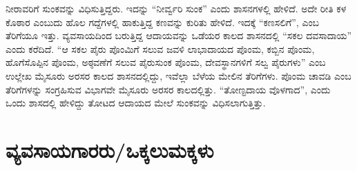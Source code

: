 ನೀರಾವರಿಗೆ ಸುಂಕವನ್ನು ವಿಧಿಸುತ್ತಿದ್ದರು. ಇದನ್ನು “ನೀರ್ವ್ವರಿ ಸುಂಕ” ಎಂದು ಶಾಸನಗಳಲ್ಲಿ ಹೇಳಿದೆ. ಅದೇ ರೀತಿ ಕಳ ಕೊಠಾರ ಎಂಬುದು ಹೊಲ ಗದ್ದೆಗಳಲ್ಲಿ ಹಾಕುತ್ತಿದ್ದ ಕಣವನ್ನು ಕುರಿತು ಹೇಳಿದೆ. ಇದಕ್ಕೆ “ಕಣಸಲಿಗೆ”, ಎಂಬ ತೆರಿಗೆಯೂ ಇತ್ತು. ವ್ಯವಸಾಯದಿಂದ ಬರುತ್ತಿದ್ದ ಆದಾಯವನ್ನು ಒಡೆಯರ ಕಾಲದ ಶಾಸನದಲ್ಲಿ “ಸಕಲ ದವಸಾದಾಯ” ಎಂದು ಕರೆದಿದೆ. “ಆ ಸಕಲ ಪೈರು ಪೊಂಮಿಗೆ ಸಲುವ ಜವಳಿ ಲಾಭಾದಾಯದ ಪೊಂಮ, ಕಬ್ಬಿನ ಪೊಂಮ, ಹೊಗೆಸೊಪ್ಪಿನ ಪೊಂಮ, ಅಠ್ಠವಣೆಗೆ ಸಲುವ ಪೈರುಸುಂಕ ಪೊಂಮ, ದೇವಸ್ಥಾನಗಳಿಗೆ ಸಲ್ವ ಪೈರುಗಳು” ಎಂಬ ಉಲ್ಲೇಖ ಮೈಸೂರು ಅರಸರ ಕಾಲದ ಶಾಸನದಲ್ಲಿದ್ದು, ಇವೆಲ್ಲಾ ಬೆಳೆಯ ಮೇಲಿನ ತೆರಿಗೆಗಳು. ಪೊಂಮ ಚಾವಡಿ ಎಂಬ ತೆರಿಗೆಗಳನ್ನು ಸಂಗ್ರಹಿಸುವ ವಿಭಾಗವೇ ಮೈಸೂರು ಅರಸರ ಕಾಲದಲ್ಲಿತ್ತು. “ತೋಣ್ಟದಾಯ ವೊಳಗಾದ”, ಎಂದು ಒಂದು ಶಾಸದಲ್ಲಿ ಹೇಳಿದ್ದು ತೋಟದ ಆದಾಯದ ಮೇಲೆ ಸುಂಕವನ್ನು ವಿಧಿಸಲಾಗುತ್ತಿತ್ತು.

\section{ವ್ಯವಸಾಯಗಾರರು/ಒಕ್ಕಲುಮಕ್ಕಳು}

